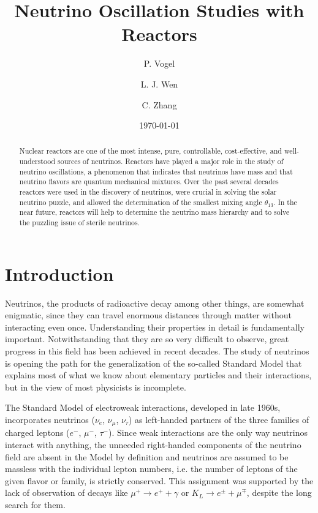 \documentclass[aps,twocolumn,preprintnumbers,amsmath,superscriptaddress,amssymb,floats,nofootinbib]{revtex4-1}
\begin{document}
\title{Neutrino Oscillation Studies with Reactors}
\date{\today}
\author{P. Vogel}
\author{L. J. Wen}
\author{C. Zhang}


\begin{abstract}
Nuclear reactors are one of the most intense, pure, controllable, cost-effective, and well-understood sources of neutrinos. Reactors have played a major 
role in the study of neutrino oscillations, a phenomenon that indicates that neutrinos have mass and that neutrino flavors are quantum mechanical mixtures. Over the past several decades reactors were used in the discovery of neutrinos, were crucial in solving the solar neutrino puzzle, and allowed the determination of the smallest mixing angle $\theta_{13}$. In the near future, reactors will help to determine the neutrino mass hierarchy and to solve the puzzling issue of sterile neutrinos.
\end{abstract}

\maketitle
\thispagestyle{plain}

\section{Introduction} 
\label{sec:intro}
Neutrinos, the products of  radioactive decay among other things, are somewhat enigmatic, since they can travel enormous distances through matter without interacting even once. 
Understanding their properties in detail is fundamentally important. Notwithstanding that they are so very difficult to observe, great progress in this field has been achieved in recent decades.   
The study of neutrinos is opening the path for the generalization of the so-called Standard Model that explains most of what we know 
about elementary particles and their interactions, but in the view of most physicists is incomplete.

The Standard Model of electroweak interactions,
developed in late 1960s, incorporates neutrinos ($\nu_e$, $\nu_\mu$, $\nu_\tau$) as left-handed partners of the three families of charged leptons ($e^-$, $\mu^-$, $\tau^-$). 
Since weak interactions are the only way neutrinos interact with anything, the unneeded right-handed components of the neutrino field are absent 
in the Model by definition and neutrinos are assumed to be massless with the individual lepton numbers, i.e. the number of leptons of the
given flavor or family, is strictly conserved.
This assignment was supported by the lack of observation of decays like 
$\mu^+ \rightarrow e^+ + \gamma$ or $K_L \rightarrow e^{\pm} + \mu^{\mp}$,
despite the long search for them.
\end{document}
